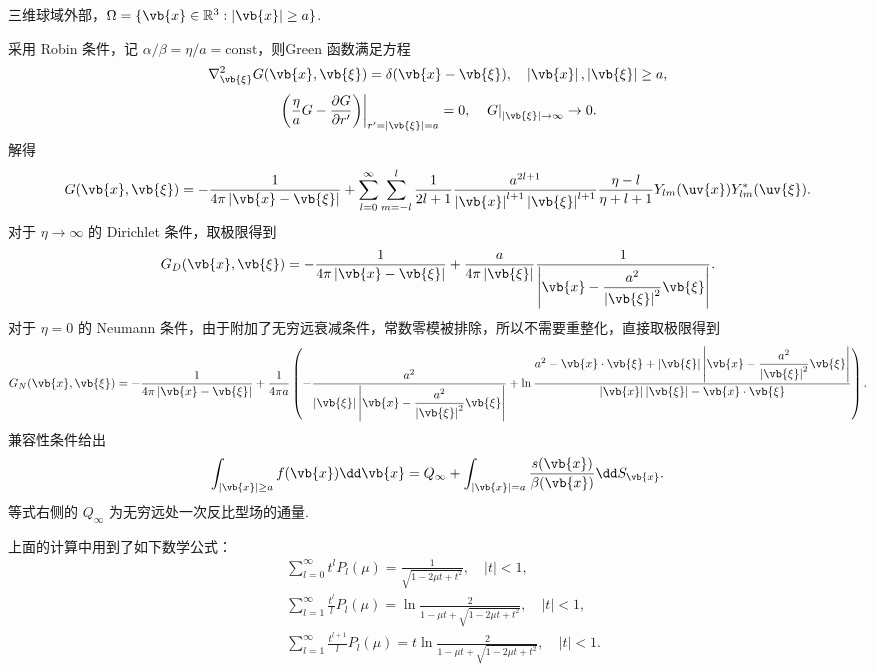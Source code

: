 \begin{exbox}
	三维球域外部，\(\Omega=\{\vb{x}\in\mathbb{R}^3:\left|\vb{x}\right|\geq a\}\).
	
	采用 Robin 条件，记 \(\alpha/\beta=\eta/a=\mathrm{const}\)，则Green 函数满足方程
	\begin{align*}
		\nabla_{\vb{\xi}}^2G(\vb{x},\vb{\xi})=\delta(\vb{x}-\vb{\xi}),\quad
		\left|\vb{x}\right|,\left|\vb{\xi}\right|\geq a,
	\end{align*}
	\begin{align*}
		\left.\left(\frac{\eta}{a}G-\frac{\partial G}{\partial r'}\right)\right|_{r'=\left|\vb{\xi}\right|=a}=0,
		\quad
		\left.G\right|_{\left|\vb{\xi}\right|\to\infty}\to0.
	\end{align*}
	解得
	\begin{align*}
		G(\vb{x},\vb{\xi})
		=-\frac{1}{4\pi\left|\vb{x}-\vb{\xi}\right|}
		+\sum_{l=0}^\infty\sum_{m=-l}^l\frac{1}{2l+1}\frac{a^{2l+1}}{\left|\vb{x}\right|^{l+1}\left|\vb{\xi}\right|^{l+1}}\frac{\eta-l}{\eta+l+1}Y_{lm}(\uv{x})Y_{lm}^*(\uv{\xi}).
	\end{align*}
	对于 \(\eta\to\infty\) 的 Dirichlet 条件，取极限得到
	\begin{align*}
		G_D(\vb{x},\vb{\xi})
		=-\frac{1}{4\pi\left|\vb{x}-\vb{\xi}\right|}
		+\frac{a}{4\pi\left|\vb{\xi}\right|}\frac{1}{\left|\vb{x}-\dfrac{a^2}{\left|\vb{\xi}\right|^2}\vb{\xi}\right|}.
	\end{align*}
	对于 \(\eta=0\) 的 Neumann 条件，由于附加了无穷远衰减条件，常数零模被排除，所以不需要重整化，直接取极限得到
	\begin{align*}
		G_N(\vb{x},\vb{\xi})
		=-\frac{1}{4\pi\left|\vb{x}-\vb{\xi}\right|}
		+\frac{1}{4\pi a}\left(-\frac{a^2}{\left|\vb{\xi}\right|\left|\vb{x}-\dfrac{a^2}{\left|\vb{\xi}\right|^2}\vb{\xi}\right|}
		+\ln\frac{a^2-\vb{x}\cdot\vb{\xi}+\left|\vb{\xi}\right|\left|\vb{x}-\dfrac{a^2}{\left|\vb{\xi}\right|^2}\vb{\xi}\right|}{\left|\vb{x}\right|\left|\vb{\xi}\right|-\vb{x}\cdot\vb{\xi}}\right).
	\end{align*}
	兼容性条件给出
	\begin{align*}
		\int_{\left|\vb{x}\right|\geq a}f(\vb{x})\dd\vb{x}
		=Q_\infty+\int_{\left|\vb{x}\right|=a}\frac{s(\vb{x})}{\beta(\vb{x})}\dd S_{\vb{x}}.
	\end{align*}
	等式右侧的 \(Q_\infty\) 为无穷远处一次反比型场的通量.
\end{exbox}

上面的计算中用到了如下数学公式：
	\begin{align*}
		&\sum_{l=0}^\infty t^lP_l(\mu)=\frac{1}{\sqrt{1-2\mu t+t^2}},\quad |t|<1,\\
		&\sum_{l=1}^\infty\frac{t^l}{l}P_l(\mu)
		=\ln\frac{2}{1-\mu t+\sqrt{1-2\mu t+t^2}},\quad |t|<1,\\
		&\sum_{l=1}^\infty\frac{t^{l+1}}{l}P_l(\mu)
		=t\ln\frac{2}{1-\mu t+\sqrt{1-2\mu t+t^2}},\quad |t|<1.
	\end{align*}


